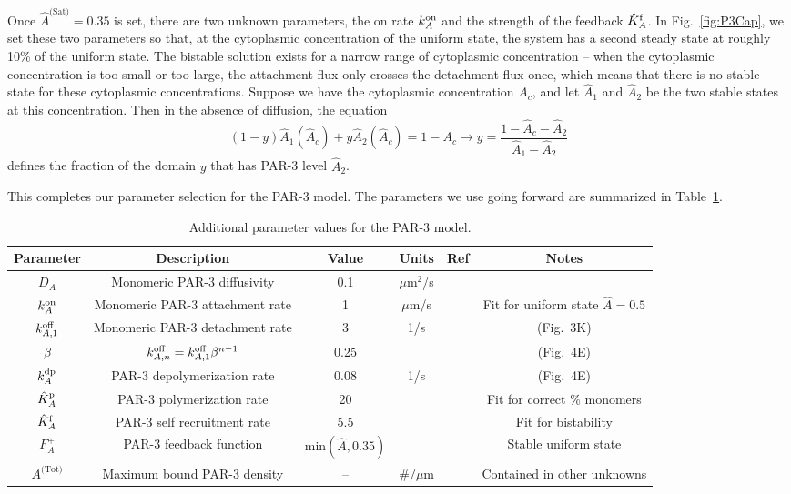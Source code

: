 \documentclass[11pt]{article}
\newcommand{\6}[1]{#1_{\text{6}}}
\newcommand{\3}[1]{#1_{\text{3}}}
\newcommand{\Tot}[1]{#1^\text{(Tot)}}
\newcommand{\Sat}[1]{#1^\text{(Sat)}}
\newcommand{\A}[1]{#1_A}
\begin{document}
Once $\Sat{\hat A}=0.35$ is set, there are two unknown parameters, the on rate $k^\text{on}_A$ and the strength of the feedback $\hat{K}^\text{f}_A$. In Fig.\ \ref{fig:P3Cap}, we set these two parameters so that, at the cytoplasmic concentration of the uniform state, the system has a second steady state at roughly 10\% of the uniform state. The bistable solution exists for a narrow range of cytoplasmic concentration -- when the cytoplasmic concentration is too small or too large, the attachment flux only crosses the detachment flux once, which means that there is no stable state for these cytoplasmic concentrations. Suppose we have the cytoplasmic concentration $A_c$, and let $\hat A_1$ and $\hat A_2$ be the two stable states at this concentration. Then in the absence of diffusion, the equation 
\begin{equation}
\label{eq:NoDiffEqn}
(1-y)\hat{A}_1\left(\hat A_c\right)+y \hat{A}_2\left(\hat A_c\right)=1-A_c \rightarrow y = \frac{1-\hat A_c-\hat A_2}{\hat A_1-\hat A_2}
\end{equation}
defines the fraction of the domain $y$ that has PAR-3 level $\hat A_2$.

This completes our parameter selection for the PAR-3 model. The parameters we use going forward are summarized in Table\ \ref{tab:paramsP3}.


\begin{table}
\begin{small}
\centering
\begin{tabular}{|c|c|c|c|c|c|}\hline
Parameter & Description & Value & Units & Ref & Notes \\ \hline
$\A{D} $ & Monomeric PAR-3 diffusivity & 0.1 & $\mu$m$^2$/s & \cite{lang2023oligomerization} & \\
$\A{\kon}$ & Monomeric PAR-3 attachment rate & 1& $\mu$m/s & & Fit for uniform state $\hat A=0.5$ \\
$k^\text{off}_{A,1}$ & Monomeric PAR-3 detachment rate &  3& 1/s & \cite{lang2023oligomerization} & (Fig.\ 3K)\\
$\beta$ & $k^\text{off}_{A,n}=k^\text{off}_{A,1}\beta^{n-1}$ & 0.25 & & \cite{lang2023oligomerization} & (Fig.\ 4E) \\
$\A{\kdp}$ & PAR-3 depolymerization rate & 0.08 & 1/s & \cite{lang2023oligomerization} & (Fig.\ 4E) \\
$\hat{K}^\text{p}_A$ & PAR-3 polymerization rate & 20 & & & Fit for correct \% monomers \cite{lang2023oligomerization}  \\
$\hat{K}^\text{f}_A$ & PAR-3 self recruitment rate &5.5 & & & Fit for bistability\\
$F_A^+$ & PAR-3 feedback function &$\text{min}\left(\hat A,0.35\right)$ &  &\cite{lang2022oligomerization} &  Stable uniform state\\
$\Tot{A}$ & Maximum bound PAR-3 density & -- & $\#/\mu$m & & Contained in other unknowns \\ \hline
\end{tabular}
\caption{\label{tab:paramsP3}Additional parameter values for the PAR-3 model. }
\end{small}
\end{table}
\end{document}
